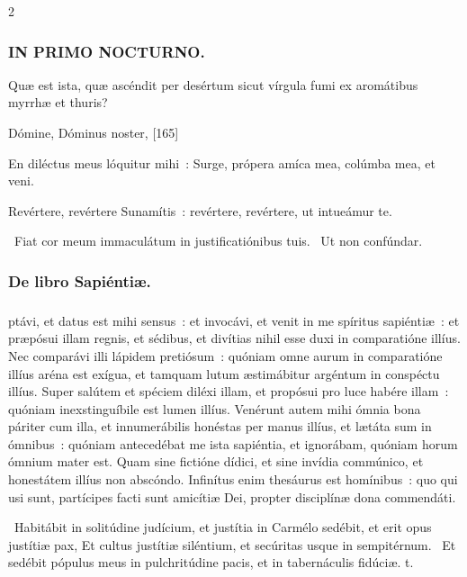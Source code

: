 \documentclass[9pt,twoside]{extarticle}
\begin{document}
\begin{multicols}{2}
{{\subsubsection*{\center \textsc{IN PRIMO NOCTURNO.}}
\begin{tightlist}{}
\item {} Quæ est ista, quæ ascéndit per desértum sicut vírgula fumi ex aromátibus myrrhæ et thuris?
\item {} Dómine, Dóminus noster,  [165]
\item {} En diléctus meus lóquitur mihi~: Surge, própera amíca mea, colúmba mea, et veni.
\item {} Revértere, revértere Sunamítis~: revértere, revértere, ut intueámur te.
\item {}~Fiat cor meum immaculátum in justificatiónibus tuis. ~Ut non confúndar.
\item {}
\end{tightlist}

\subsubsection*{\center De libro Sapiéntiæ.}
\subsubsection*{\center {} \hfill {}}
ptávi, et datus est mihi sensus~: et invocávi, et venit in me spíritus sapiéntiæ~: et præpósui illam regnis, et sédibus, et divítias nihil esse duxi in comparatióne illíus. Nec comparávi illi lápidem pretiósum~: quóniam omne aurum in comparatióne illíus aréna est exígua, et tamquam lutum æstimábitur argéntum in conspéctu illíus. Super salútem et spéciem diléxi illam, et propósui pro luce habére illam~: quóniam inexstinguíbile est lumen illíus. Venérunt autem mihi ómnia bona páriter cum illa, et innumerábilis honéstas per manus illíus, et lætáta sum in ómnibus~: quóniam antecedébat me ista sapiéntia, et ignorábam, quóniam horum ómnium mater est. Quam sine fictióne dídici, et sine invídia commúnico, et honestátem illíus non abscóndo. Infinítus enim thesáurus est homínibus~: quo qui usi sunt, partícipes facti sunt amicítiæ Dei, propter disciplínæ dona commendáti.

\begin{tightlist}{}
\item {}~Habitábit in solitúdine judícium, et justítia in Carmélo sedébit, et erit opus justítiæ pax, \textred{*} Et cultus justítiæ siléntium, et secúritas usque in sempitérnum. ~Et sedébit pópulus meus in pulchritúdine pacis, et in tabernáculis fidúciæ. t.
\end{tightlist}

}}
\end{multicols}
\end{document}
